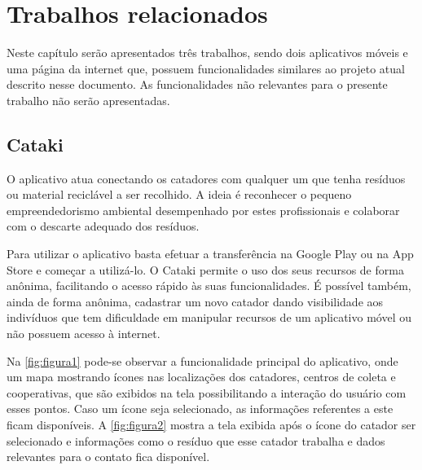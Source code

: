 \documentclass[
	12pt,				%
	openany,			%
	twoside,			%
	a4paper,			%
	english,			%
	french,				%
	spanish,			%
	brazil				%
	]{abntex2}
\begin{document}
\chapter{Trabalhos relacionados}

Neste capítulo serão apresentados três trabalhos, sendo dois aplicativos móveis e uma página da internet que, possuem funcionalidades similares ao projeto atual descrito nesse documento. As funcionalidades não relevantes para o presente trabalho não serão apresentadas.

\section{Cataki}
O aplicativo atua conectando os catadores com qualquer um que tenha resíduos ou material reciclável a ser recolhido. A ideia é reconhecer o pequeno empreendedorismo ambiental desempenhado por estes profissionais e colaborar com o descarte adequado dos resíduos.

Para utilizar o aplicativo basta efetuar a transferência na Google Play\cite{googleplay} ou na App Store\cite{appstore} e começar a utilizá-lo. O Cataki permite o uso dos seus recursos de forma anônima, facilitando o acesso rápido às suas funcionalidades. É possível também, ainda de forma anônima, cadastrar um novo catador dando visibilidade aos indivíduos que tem dificuldade em manipular recursos de um aplicativo móvel ou não possuem acesso à internet.

Na \autoref{fig:figura1} pode-se observar a funcionalidade principal do aplicativo, onde um mapa mostrando ícones nas localizações dos catadores, centros de coleta e cooperativas, que são exibidos na tela possibilitando a interação do usuário com esses pontos. Caso um ícone seja selecionado, as informações referentes a este ficam disponíveis. A \autoref{fig:figura2} mostra a tela exibida após o ícone do catador ser selecionado e informações como o resíduo que esse catador trabalha e dados relevantes para o contato fica disponível. 
    
\end{document}
